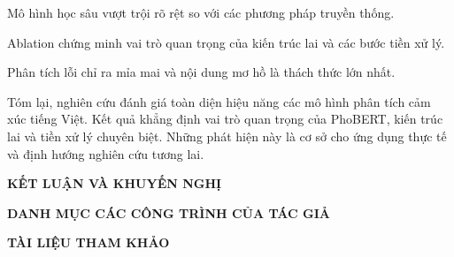 \documentclass[14pt, a4paper]{report}
\begin{document}
Mô hình học sâu vượt trội rõ rệt so với các phương pháp truyền thống.

Ablation chứng minh vai trò quan trọng của kiến trúc lai và các bước tiền xử lý.

Phân tích lỗi chỉ ra mỉa mai và nội dung mơ hồ là thách thức lớn nhất.

Tóm lại, nghiên cứu đánh giá toàn diện hiệu năng các mô hình phân tích cảm xúc tiếng Việt. Kết quả khẳng định vai trò quan trọng của PhoBERT, kiến trúc lai và tiền xử lý chuyên biệt. Những phát hiện này là cơ sở cho ứng dụng thực tế và định hướng nghiên cứu tương lai.

\newpage

\noindent\textbf{\Large KẾT LUẬN VÀ KHUYẾN NGHỊ}

\medskip\noindent\textbf{\Large DANH MỤC CÁC CÔNG TRÌNH CỦA TÁC GIẢ}

\medskip\noindent\textbf{\Large TÀI LIỆU THAM KHẢO}
\end{document}
